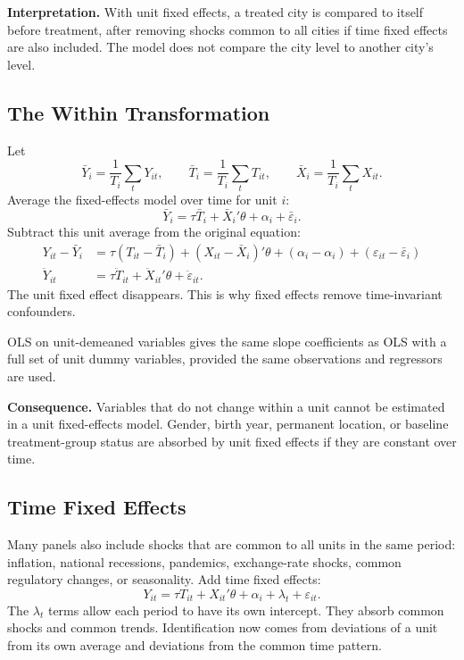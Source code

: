 \begin{boxF}
\textbf{Interpretation.} With unit fixed effects, a treated city is compared to
itself before treatment, after removing shocks common to all cities if time
fixed effects are also included. The model does not compare the city level to
another city's level.
\end{boxF}

\subsection{The Within Transformation}

Let
\[
    \bar{Y}_i=\frac{1}{T_i}\sum_t Y_{it},
    \qquad
    \bar{T}_i=\frac{1}{T_i}\sum_t T_{it},
    \qquad
    \bar{X}_i=\frac{1}{T_i}\sum_t X_{it}.
\]
Average the fixed-effects model over time for unit $i$:
\[
    \bar{Y}_i
    =
    \tau \bar{T}_i+\bar{X}_i'\theta+\alpha_i+\bar{\varepsilon}_i.
\]
Subtract this unit average from the original equation:
\[
\begin{aligned}
    Y_{it}-\bar{Y}_i
    &=
    \tau(T_{it}-\bar{T}_i)
    +(X_{it}-\bar{X}_i)'\theta
    +(\alpha_i-\alpha_i)
    +(\varepsilon_{it}-\bar{\varepsilon}_i)\\
    \ddot{Y}_{it}
    &=
    \tau\ddot{T}_{it}
    +\ddot{X}_{it}'\theta
    +\ddot{\varepsilon}_{it}.
\end{aligned}
\]
The unit fixed effect disappears. This is why fixed effects remove
time-invariant confounders.

\begin{thmN}
OLS on unit-demeaned variables gives the same slope coefficients as OLS with a
full set of unit dummy variables, provided the same observations and regressors
are used.
\end{thmN}

\begin{boxD}
\textbf{Consequence.} Variables that do not change within a unit cannot be
estimated in a unit fixed-effects model. Gender, birth year, permanent location,
or baseline treatment-group status are absorbed by unit fixed effects if they
are constant over time.
\end{boxD}

\subsection{Time Fixed Effects}

Many panels also include shocks that are common to all units in the same period:
inflation, national recessions, pandemics, exchange-rate shocks, common
regulatory changes, or seasonality. Add time fixed effects:
\[
    Y_{it}
    =
    \tau T_{it}+X_{it}'\theta+\alpha_i+\lambda_t+\varepsilon_{it}.
\]
The $\lambda_t$ terms allow each period to have its own intercept. They absorb
common shocks and common trends. Identification now comes from deviations of a
unit from its own average and deviations from the common time pattern.

